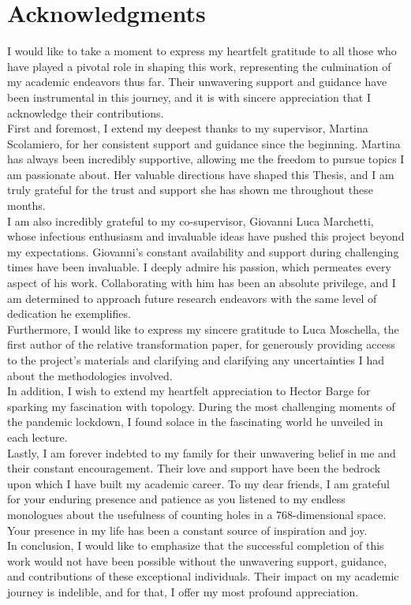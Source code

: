 \documentclass[../main.tex]{subfiles}
\begin{document}
\section*{Acknowledgments}
I would like to take a moment to express my heartfelt gratitude to all those who have played a pivotal role in shaping this work, representing the culmination of my academic endeavors thus far. Their unwavering support and guidance have been instrumental in this journey, and it is with sincere appreciation that I acknowledge their contributions.\\

First and foremost, I extend my deepest thanks to my supervisor, Martina Scolamiero, for her consistent support and guidance since the beginning. Martina has always been incredibly supportive, allowing me the freedom to pursue topics I am passionate about. Her valuable directions have shaped this Thesis, and I am truly grateful for the trust and support she has shown me throughout these months.\\

I am also incredibly grateful to my co-supervisor, Giovanni Luca Marchetti, whose infectious enthusiasm and invaluable ideas have pushed this project beyond my expectations. Giovanni's constant availability and support during challenging times have been invaluable. I deeply admire his passion, which permeates every aspect of his work. Collaborating with him has been an absolute privilege, and I am determined to approach future research endeavors with the same level of dedication he exemplifies.\\

Furthermore, I would like to express my sincere gratitude to Luca Moschella, the first author of the relative transformation paper, for generously providing access to the project's materials and clarifying and clarifying any uncertainties I had about the methodologies involved.\\

In addition, I wish to extend my heartfelt appreciation to Hector Barge for sparking my fascination with topology. During the most challenging moments of the pandemic lockdown, I found solace in the fascinating world he unveiled in each lecture.\\ 

Lastly, I am forever indebted to my family for their unwavering belief in me and their constant encouragement. Their love and support have been the bedrock upon which I have built my academic career. To my dear friends, I am grateful for your enduring presence and patience as you listened to my endless monologues about the usefulness of counting holes in a 768-dimensional space. Your presence in my life has been a constant source of inspiration and joy.\\

In conclusion, I would like to emphasize that the successful completion of this work would not have been possible without the unwavering support, guidance, and contributions of these exceptional individuals. Their impact on my academic journey is indelible, and for that, I offer my most profound appreciation.
\acknowlegmentssignature
\end{document}
